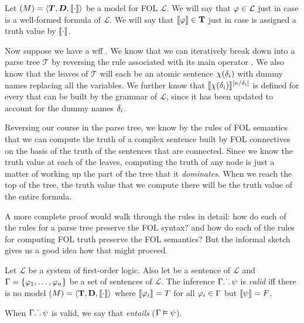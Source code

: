 \begin{observation}
  Let $\mathcal(M)=\langle\boldsymbol{T},\boldsymbol{D},\llbracket\cdot\rrbracket\rangle$
  be a model for FOL $\mathcal{L}$. We will say that $\varphi\in\mathcal{L}$ just
  in case \ephi is a well-formed formula of $\mathcal{L}$. We will say that
  $\llbracket\varphi\rrbracket\in\mathbf{T}$ just in case \ephi is assigned a truth value
  by $\llbracket\cdot\rrbracket$.

  Now suppose we have a wff \epsi. We know that we can iteratively break \epsi
  down into a parse tree $\mathcal{T}$ by reversing the rule associated with its
  main operator \etheta. We also know that the leaves of $\mathcal{T}$ will each
  be an atomic sentence $\chi(\delta_i)$ with dummy names replacing all the
  variables. We further know that $\llbracket\chi(\delta_i)\rrbracket^{[n/\delta_i]}$ is
  defined for every \echi that can be built by the grammar of $\mathcal{L}$,
  since it has been updated to account for the dummy names $\delta_i$.

  Reversing our course in the parse tree, we know by the rules of FOL semantics
  that we can compute the truth of a complex sentence built by FOL connectives
  on the basis of the truth of the sentences that are connected. Since we know
  the truth value at each of the leaves, computing the truth of any node is just
  a matter of working up the part of the tree that it \emph{dominates}. When we
  reach the top of the tree, the truth value that we compute there will be the
  truth value of the entire formula.
\end{observation}

A more complete proof would walk through the rules in detail: how do each of
the rules for a parse tree preserve the FOL syntax? and how do each of the rules
for computing FOL truth preserve the FOL semantics? But the informal sketch
gives us a good idea how that might proceed.

\begin{definition}
  Let $\mathcal{L}$ be a system of first-order logic. Also let \epsi be a
  sentence of $\mathcal{L}$ and $\Gamma=\{\varphi_1,\dots,\varphi_n\}$ be a set of
  sentences of $\mathcal{L}$. The inference $\Gamma\ldotp\dot{}\,\ldotp\psi$ is
  \emph{valid} iff there is no model
  $\mathcal(M)=\langle\mathbf{T},\mathbf{D},\llbracket\cdot\rrbracket\rangle$
  where $\llbracket\varphi_i\rrbracket=T$ for all $\varphi_i\in\Gamma$ but
  $\llbracket\psi\rrbracket=F$.

  When $\Gamma\ldotp\dot{}\,\ldotp\psi$ is valid, we say that \eGamma \emph{entails}
  \epsi ($\Gamma\vDash\psi$).
\end{definition}

